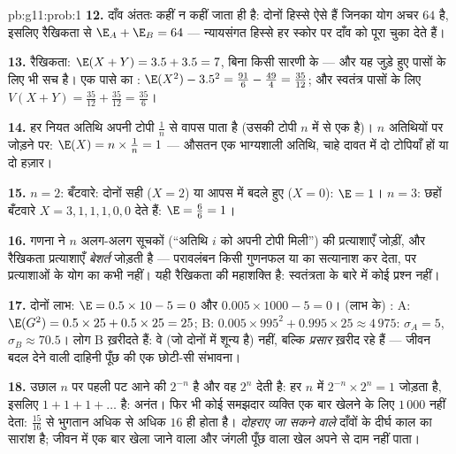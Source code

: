 \begin{solution}{pb:g11:prob:1}
\textbf{12.} दाँव अंततः कहीं न कहीं जाता ही है: दोनों हिस्से ऐसे  हैं जिनका योग अचर $64$ है, इसलिए रैखिकता से $\E_A + \E_B = 64$ --- न्यायसंगत हिस्से
हर स्कोर पर दाँव को पूरा चुका देते हैं।

\textbf{13.} रैखिकता: $\E(X + Y) = 3.5 + 3.5 = 7$, बिना किसी सारणी के --- और यह जुड़े हुए पासों
के लिए भी सच है। एक पासे का : $\E(X^2) - 3.5^2 = \frac{91}{6} - \frac{49}{4} = \frac{35}{12}$; और स्वतंत्र पासों के लिए $V(X + Y) = \frac{35}{12} + \frac{35}{12} = \frac{35}{6}$।

\textbf{14.} हर नियत अतिथि अपनी टोपी  $\frac1n$ से वापस पाता है (उसकी
टोपी $n$ में से एक है)। $n$ अतिथियों पर जोड़ने पर: $\E(X) = n \times \frac1n = 1$ --- औसतन एक
भाग्यशाली अतिथि, चाहे दावत में दो टोपियाँ हों या दो हज़ार।

\textbf{15.} $n = 2$: बँटवारे: दोनों सही ($X = 2$) या आपस में बदले हुए ($X = 0$):
$\E = 1$। $n = 3$: छहों बँटवारे $X = 3, 1, 1, 1, 0, 0$ देते हैं: $\E = \frac{6}{6} = 1$।

\textbf{16.} गणना ने $n$ अलग-अलग सूचकों (``अतिथि $i$ को अपनी टोपी
मिली'') की प्रत्याशाएँ जोड़ीं, और रैखिकता प्रत्याशाएँ \emph{बेशर्त} जोड़ती
है --- परावलंबन किसी गुणनफल या  का सत्यानाश कर देता, पर प्रत्याशाओं
के योग का कभी नहीं। यही रैखिकता की महाशक्ति है: स्वतंत्रता के बारे में कोई
प्रश्न नहीं।

\textbf{17.} दोनों लाभ: $\E = 0.5 \times 10 - 5 = 0$ और $0.005 \times 1000 - 5 = 0$। (लाभ के) : A: $\E(G^2) = 0.5 \times 25 + 0.5 \times 25 = 25$; B: $0.005 \times 995^2 + 0.995 \times 25 \approx 4\,975$:
$\sigma_A = 5$, $\sigma_B \approx 70.5$। लोग B ख़रीदते हैं: वे  (जो दोनों में शून्य है) नहीं,
बल्कि \emph{प्रसार} ख़रीद रहे हैं --- जीवन बदल देने वाली दाहिनी पूँछ की एक
छोटी-सी संभावना।

\textbf{18.} उछाल $n$ पर पहली पट आने की  $2^{-n}$ है और वह $2^n$
देती है: हर $n$  में $2^{-n} \times 2^n = 1$ जोड़ता है, इसलिए  $1 + 1 + 1 + \dots$ है:
अनंत। फिर भी कोई समझदार व्यक्ति एक बार खेलने के लिए $1\,000$ नहीं देता:
 $\frac{15}{16}$ से भुगतान अधिक से अधिक $16$ ही होता है। 
\emph{दोहराए जा सकने वाले} दाँवों के दीर्घ काल का सारांश है; जीवन में एक बार
खेला जाने वाला और जंगली पूँछ वाला खेल अपने  से दाम नहीं पाता।


\end{solution}

